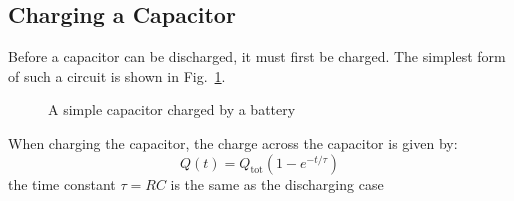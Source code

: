 \subsection{Charging a Capacitor}
Before a capacitor can be discharged, it must first be charged. The simplest
form of such a circuit is shown in Fig.~\ref{fig:charging-capacitor}.
\begin{figure}[ht]
  \centering
  \caption{A simple capacitor charged by a battery}
  \label{fig:charging-capacitor}
\end{figure}
  
When charging the capacitor, the charge across the capacitor is given by:
\begin{equation}
  \boxed{
    Q(t)=Q_\text{tot}(1-e^{-t/\tau})
  }
\end{equation}
the time constant $\tau=RC$ is the same as the discharging case

%    

%

